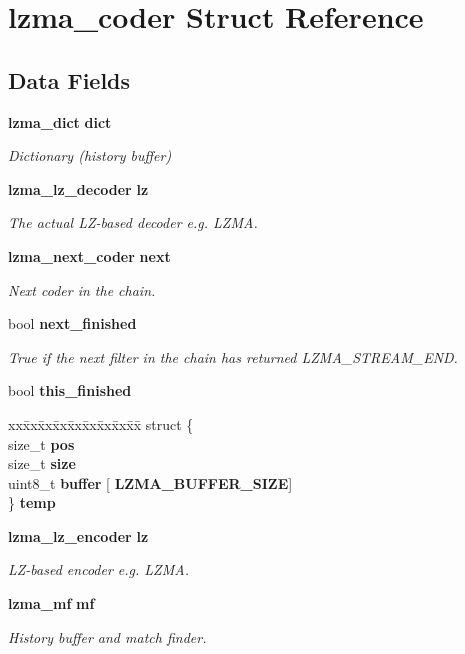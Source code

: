 \section{lzma\+\_\+coder Struct Reference}
\label{structlzma__coder}
\subsection*{Data Fields}
\begin{DoxyCompactItemize}
\item 
\textbf{ lzma\+\_\+dict} \textbf{ dict}
\begin{DoxyCompactList}\small\item\em Dictionary (history buffer) \end{DoxyCompactList}\item 
\textbf{ lzma\+\_\+lz\+\_\+decoder} \textbf{ lz}
\begin{DoxyCompactList}\small\item\em The actual L\+Z-\/based decoder e.\+g. L\+Z\+MA. \end{DoxyCompactList}\item 
\textbf{ lzma\+\_\+next\+\_\+coder} \textbf{ next}
\begin{DoxyCompactList}\small\item\em Next coder in the chain. \end{DoxyCompactList}\item 
bool \textbf{ next\+\_\+finished}
\begin{DoxyCompactList}\small\item\em True if the next filter in the chain has returned L\+Z\+M\+A\+\_\+\+S\+T\+R\+E\+A\+M\+\_\+\+E\+ND. \end{DoxyCompactList}\item 
bool \textbf{ this\+\_\+finished}
\item 
\begin{tabbing}
xx\=xx\=xx\=xx\=xx\=xx\=xx\=xx\=xx\=\kill
struct \{\\
\>size\_t {\bfseries pos}\\
\>size\_t {\bfseries size}\\
\>uint8\_t {\bfseries buffer} [\textbf{ LZMA\_BUFFER\_SIZE}]\\
\} \textbf{ temp}\\

\end{tabbing}\item 
\textbf{ lzma\+\_\+lz\+\_\+encoder} \textbf{ lz}
\begin{DoxyCompactList}\small\item\em L\+Z-\/based encoder e.\+g. L\+Z\+MA. \end{DoxyCompactList}\item 
\textbf{ lzma\+\_\+mf} \textbf{ mf}
\begin{DoxyCompactList}\small\item\em History buffer and match finder. \end{DoxyCompactList}\end{DoxyCompactItemize}


